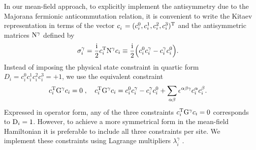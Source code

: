 In our mean-field approach, to explicitly implement the antisymmetry due to the Majorana fermionic anticommutation relation, it is convenient to write the Kitaev representation in terms of the vector $c_i^{\phantom 1}=(c_i^0,c_i^1,c_i^2,c_i^3)^{\rm T}$ and the antisymmetric matrices $\mathrm{N}^\gamma$ defined by
\begin{equation}
    \sigma_i^\gamma =   \frac{\mathrm{i}}{2}  c_i^{{\mathrm{T}}} \mathrm{N}^\gamma  c_i \equiv \frac{\mathrm{i}}{2}\Big( c_i^0c_i^\gamma - c_i^\gamma c_i^0 \Big) .
    \label{eq:spin_rep}
\end{equation}
Instead of imposing the physical state constraint in quartic form $D_i= c^0_i c^1_i c^2_i c^3_i=+1$, we use the equivalent constraint \cite{Seifert_2018}
\begin{align}
    c_i^{{\mathrm{T}}} \mathrm{G}^\gamma  c_i
    = 0 \; , \quad
    c_i^{{\mathrm{T}}} \mathrm{G}^\gamma  c_i =c_i^0c_i^\gamma - c_i^\gamma c_i^0 +\sum_{\alpha\beta} \epsilon^{\alpha \beta \gamma} c_i^\alpha c_i^\beta  .  \label{eq:G=0}
\end{align}
Expressed in operator form, any of the three constraints $c_i^{{\mathrm{T}}} \mathrm{G}^\gamma c_i =0$ corresponds to $\mathrm{D}_i=1$. However, to achieve a more symmetrical form in the mean-field Hamiltonian it is preferable to include all three constraints per site. We implement these constraints using Lagrange multipliers $\lambda_i^\gamma$ \cite{Ralko2020,Yilmaz2022}.


